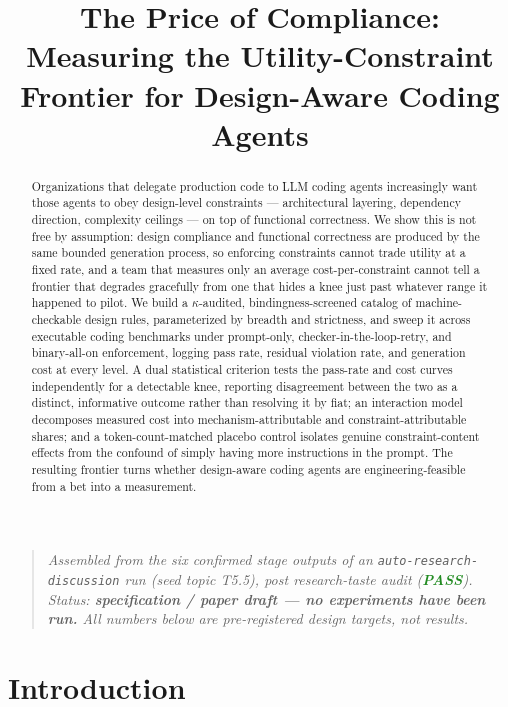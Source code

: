 \documentclass[11pt]{article}
\title{\textbf{The Price of Compliance:\\ Measuring the Utility-Constraint Frontier for Design-Aware Coding Agents}}
\author{}
\date{}
\begin{document}
\maketitle
\vspace{-2em}

\begin{quote}
\small\textit{Assembled from the six confirmed stage outputs of an \texttt{auto-research-discussion} run (seed topic T5.5), post research-taste audit (\textcolor{ForestGreen}{\textbf{PASS}}). Status: \textbf{specification / paper draft --- no experiments have been run.} All numbers below are pre-registered design targets, not results.}
\end{quote}

\begin{abstract}
Organizations that delegate production code to LLM coding agents increasingly want those agents to obey design-level constraints --- architectural layering, dependency direction, complexity ceilings --- on top of functional correctness. We show this is not free by assumption: design compliance and functional correctness are produced by the same bounded generation process, so enforcing constraints cannot trade utility at a fixed rate, and a team that measures only an average cost-per-constraint cannot tell a frontier that degrades gracefully from one that hides a knee just past whatever range it happened to pilot. We build a $\kappa$-audited, bindingness-screened catalog of machine-checkable design rules, parameterized by breadth and strictness, and sweep it across executable coding benchmarks under prompt-only, checker-in-the-loop-retry, and binary-all-on enforcement, logging pass rate, residual violation rate, and generation cost at every level. A dual statistical criterion tests the pass-rate and cost curves independently for a detectable knee, reporting disagreement between the two as a distinct, informative outcome rather than resolving it by fiat; an interaction model decomposes measured cost into mechanism-attributable and constraint-attributable shares; and a token-count-matched placebo control isolates genuine constraint-content effects from the confound of simply having more instructions in the prompt. The resulting frontier turns whether design-aware coding agents are engineering-feasible from a bet into a measurement.
\end{abstract}

\section{Introduction}
\end{document}
